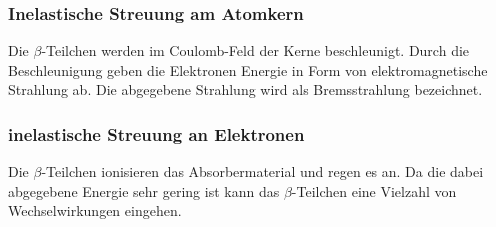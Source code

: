 \subsubsection{Inelastische Streuung am Atomkern}
Die $\beta$-Teilchen werden im Coulomb-Feld der Kerne beschleunigt.
Durch die Beschleunigung geben die Elektronen Energie in Form von elektromagnetische Strahlung ab.
Die abgegebene Strahlung wird als Bremsstrahlung bezeichnet.
\subsubsection{inelastische Streuung an Elektronen}
Die $\beta$-Teilchen ionisieren das Absorbermaterial und regen es an. Da die dabei abgegebene Energie sehr gering ist kann das $\beta$-Teilchen eine Vielzahl von Wechselwirkungen eingehen.\\\\\\


